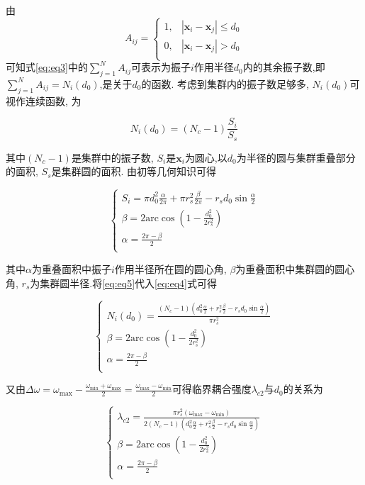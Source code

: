 \documentclass{article}
\begin{document}
由
$$
A_{ij}=\begin{cases}
	1,&		\left| \mathbf{x}_i-\mathbf{x}_j \right|\leqslant d_0\\
	0,&		\left| \mathbf{x}_i-\mathbf{x}_j \right|>d_0\\
\end{cases}
$$
可知式\ref{eq:eq3}中的$\sum_{j=1}^N{A_{ij}}$可表示为振子$i$作用半径$d_0$内的其余振子数,即$\sum_{j=1}^N{A_{ij}}=N_i\left( d_0 \right)$,是关于$d_0$的函数. 考虑到集群内的振子数足够多, $N_i\left( d_0 \right)$可视作连续函数, 为

\begin{equation}\label{eq:eq4}
	N_i\left( d_0 \right) =\left( N_c-1 \right) \frac{S_i}{S_s}
\end{equation}

其中$(N_c-1)$是集群中的振子数, $S_i$是$\mathbf{x}_i$为圆心,以$d_0$为半径的圆与集群重叠部分的面积, $S_s$是集群圆的面积. 由初等几何知识可得

\begin{equation}\label{eq:eq5}
	\begin{cases}
		S_i=\pi d_{0}^{2}\frac{\alpha}{2\pi}+\pi r_{s}^{2}\frac{\beta}{2\pi}-r_sd_0\sin \frac{\alpha}{2}\\
		\beta =2\mathrm{arc}\cos \left( 1-\frac{d_{0}^{2}}{2r_{s}^{2}} \right)\\
		\alpha =\frac{2\pi -\beta}{2}\\
	\end{cases}
\end{equation}

其中$\alpha$为重叠面积中振子$i$作用半径所在圆的圆心角, $\beta$为重叠面积中集群圆的圆心角, $r_s$为集群圆半径.将\ref{eq:eq5}代入\ref{eq:eq4}式可得

$$
\begin{cases}
	N_i\left( d_0 \right) =\frac{\left( N_c-1 \right) \left( d_{0}^{2}\frac{\alpha}{2}+r_{s}^{2}\frac{\beta}{2}-r_sd_0\sin \frac{\alpha}{2} \right)}{\pi r_{s}^{2}}\\
	\beta =2\mathrm{arc}\cos \left( 1-\frac{d_{0}^{2}}{2r_{s}^{2}} \right)\\
	\alpha =\frac{2\pi -\beta}{2}\\
\end{cases}
$$

又由$\Delta \omega =\omega _{\max}-\frac{\omega _{\min}+\omega _{\max}}{2}=\frac{\omega _{\max}-\omega _{\min}}{2}$可得临界耦合强度$\lambda _{c2}$与$d_0$的关系为

$$
\begin{cases}
	\lambda _{c2}=\frac{\pi r_{s}^{2}\left( \omega _{\max}-\omega _{\min} \right)}{2\left( N_c-1 \right) \left( d_{0}^{2}\frac{\alpha}{2}+r_{s}^{2}\frac{\beta}{2}-r_sd_0\sin \frac{\alpha}{2} \right)}\\
	\beta =2\mathrm{arc}\cos \left( 1-\frac{d_{0}^{2}}{2r_{s}^{2}} \right)\\
	\alpha =\frac{2\pi -\beta}{2}\\
\end{cases}
$$
\end{document}
